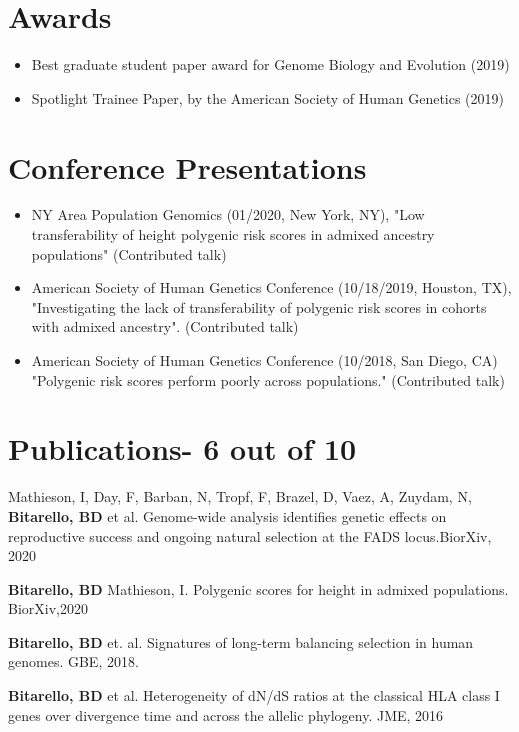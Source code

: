 \documentclass{article}
\begin{document}
\section{Awards}
\begin{itemize}
\item Best graduate student paper award for Genome Biology and Evolution (2019)
\item  Spotlight Trainee Paper, by the
American Society of Human Genetics (2019)
\end{itemize}

\section{Conference Presentations }

\begin{itemize}
\item  NY Area Population Genomics (01/2020, New York, NY), "Low transferability of height polygenic risk scores in admixed ancestry populations" (Contributed talk)
\item American Society of Human Genetics Conference (10/18/2019, Houston, TX), "Investigating the lack of transferability of polygenic risk scores in cohorts with admixed ancestry". (Contributed talk)
\item American Society of Human Genetics Conference (10/2018, San Diego, CA) "Polygenic risk scores perform poorly across populations." (Contributed talk)
\end{itemize}

 
\section{Publications\small - 6 out of 10}
Mathieson, I, Day, F, Barban, N, Tropf, F, Brazel, D, Vaez, A,  Zuydam, N, \textbf{Bitarello, BD} et al. Genome-wide analysis identifies genetic effects on reproductive success and ongoing natural selection at the FADS locus.BiorXiv, 2020

\textbf{Bitarello, BD} Mathieson, I. Polygenic scores for height in admixed populations. BiorXiv,2020

\textbf{Bitarello, BD} et. al. Signatures of long-term balancing selection in human genomes.
GBE, 2018.

\textbf{Bitarello, BD} et al. Heterogeneity of dN/dS ratios at the classical HLA class I genes over divergence time and across the allelic phylogeny. JME, 2016
\end{document}
